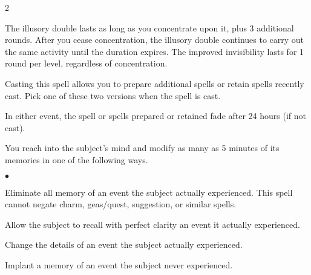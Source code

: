 \begin{multicols}{2}
\begin{small}
\smallskip\noindent The illusory double lasts as long as you concentrate upon it, plus 3 additional rounds. After you cease concentration, the illusory double continues to carry out the same activity until the duration expires. The improved invisibility lasts for 1 round per level, regardless of concentration.

\noindent Casting this spell allows you to prepare additional spells or retain spells recently cast. Pick one of these two versions when the spell is cast.


\smallskip\noindent In either event, the spell or spells prepared or retained fade after 24 hours (if not cast).


\noindent You reach into the subject's mind and modify as many as 5 minutes of its memories in one of the following ways.

\begin{list}{$\bullet$}{\itemspace}
  \item Eliminate all memory of an event the subject actually experienced. This spell cannot negate charm, geas/quest, suggestion, or similar spells.
  \item  Allow the subject to recall with perfect clarity an event it actually experienced.
  \item  Change the details of an event the subject actually experienced.
  \item  Implant a memory of an event the subject never experienced.
\end{list}


\end{small}
\end{multicols}
